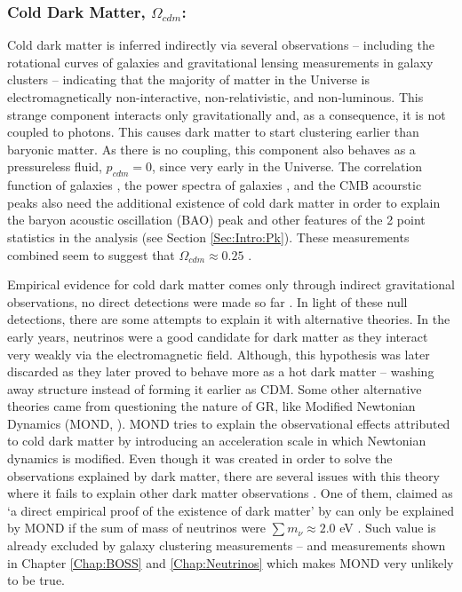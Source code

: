 \subsubsection{Cold Dark Matter, $\Omega_{cdm}$:}
Cold dark matter is inferred indirectly via several observations -- including the rotational curves of galaxies \citep{1970Rubin} and gravitational lensing measurements in galaxy clusters \citep{2006BulletCluster} -- indicating that the majority of matter in the Universe is electromagnetically non-interactive, non-relativistic, and non-luminous. This strange component interacts only gravitationally and, as a consequence, it is not coupled to photons. This causes dark matter to start clustering earlier than baryonic matter. As there is no coupling, this component also behaves as a pressureless fluid, $p_{cdm} = 0$, since very early in the Universe. The correlation function of galaxies \citep{Einsenstein2005}, the power spectra of galaxies \citep{Blake2007,BOSS}, and the CMB acourstic peaks \citep{PlanckCosmology2016,PlanckResults2015,2018PlanckCosmology} also need the additional existence of cold dark matter in order to explain the baryon acoustic oscillation (BAO) peak and other features of the 2 point statistics in the analysis (see Section \ref{Sec:Intro:Pk}). These measurements combined seem to suggest that $\Omega_{cdm} \approx 0.25$ .

\qquad Empirical evidence for cold dark matter comes only through indirect gravitational observations, no direct detections were made so far \citep{2017DarkMatterExpReview}. In light of these null detections, there are some attempts to explain it with alternative theories. In the early years, neutrinos were a good candidate for dark matter as they interact very weakly via the electromagnetic field. Although, this hypothesis was later discarded as they later proved to behave more as a hot dark matter -- washing away structure instead of forming it earlier as CDM. Some other alternative theories came from questioning the nature of GR, like Modified Newtonian Dynamics (MOND, \citealt{1983MOND}). MOND tries to explain the observational effects attributed to cold dark matter by introducing an acceleration scale in which Newtonian dynamics is modified. Even though it was created in order to solve the observations explained by dark matter, there are several issues with this theory where it fails to explain other dark matter observations \citep{2011MondSucks}. One of them, claimed as `a direct empirical proof of the existence of dark matter' by \cite{2006BulletCluster} can only be explained by MOND if the sum of mass of neutrinos were $\sum m_{\nu} \approx 2.0$ eV \citep{2007ApJ...654L..13A}. Such value is already excluded by galaxy clustering measurements -- \citealt{Thomas2010Neutr,2014Gonzalez-GarciaNeutrino} and measurements shown in Chapter \ref{Chap:BOSS} and \ref{Chap:Neutrinos} which makes MOND very unlikely to be true.  


